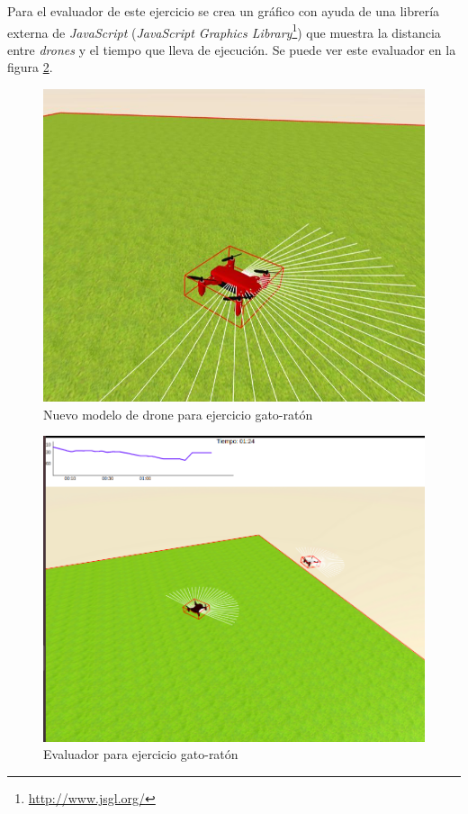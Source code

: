 Para el evaluador de este ejercicio se crea un gráfico con ayuda de una librería externa de \textit{JavaScript} (\textit{JavaScript Graphics Library}\footnote{\url{http://www.jsgl.org/}}) que muestra la distancia entre \textit{drones} y el tiempo que lleva de ejecución. Se puede ver este evaluador en la figura \ref{fig:evaluador_gato_raton}.
  
    \begin{figure}[ht]
    \centering           
    \includegraphics[scale=0.5]{img/red_drone.jpg}
    \caption{Nuevo modelo de drone para ejercicio gato-ratón}
    \label{fig:drone_rojo}
    
\end{figure}
\begin{figure}[ht]
\centering           
\includegraphics[scale=0.3]{img/evaluador_drone.png}
\caption{Evaluador para ejercicio gato-ratón}
\label{fig:evaluador_gato_raton}
\end{figure}
